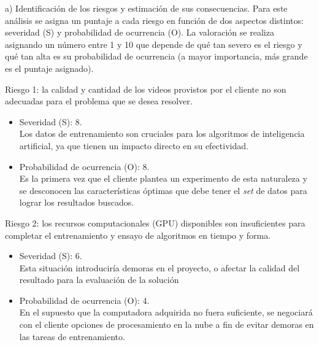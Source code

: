 \documentclass[
11pt, %
]{charter}
\begin{document}
a) Identificación de los riesgos y estimación de sus consecuencias. Para este análisis se asigna un puntaje a cada riesgo en función de dos aspectos distintos: severidad (S)  y probabilidad de ocurrencia (O). La valoración se realiza asignando un número entre 1 y 10 que depende de qué tan severo es el riesgo y qué tan alta es su probabilidad de ocurrencia (a mayor importancia, más grande es el puntaje asignado).

Riesgo 1: la calidad y cantidad de los videos provistos por el cliente no son adecuadas para el problema que se desea resolver.

\begin{itemize}
	\item Severidad (S): 8.\\
	Los datos de entrenamiento son cruciales para los algoritmos de inteligencia artificial, ya que tienen un impacto directo en su efectividad.
	\item Probabilidad de ocurrencia (O): 8.\\
	Es la primera vez que el cliente plantea un experimento de esta naturaleza y se desconocen las características óptimas que debe tener el \textit{set} de datos para lograr los resultados buscados.
\end{itemize}   

Riesgo 2: los recursos computacionales (GPU) disponibles son insuficientes para completar el entrenamiento y ensayo de algoritmos en tiempo y forma.
\begin{itemize}
	\item Severidad (S): 6. \\
	Esta situación introduciría demoras en el proyecto,  o afectar la calidad del resultado para la evaluación de la solución
	\item Probabilidad de ocurrencia (O): 4. \\
	En el supuesto que la computadora adquirida no fuera suficiente, se negociará con el cliente opciones de procesamiento en la nube a fin de evitar demoras en las tareas de entrenamiento.
\end{itemize}
\end{document}
